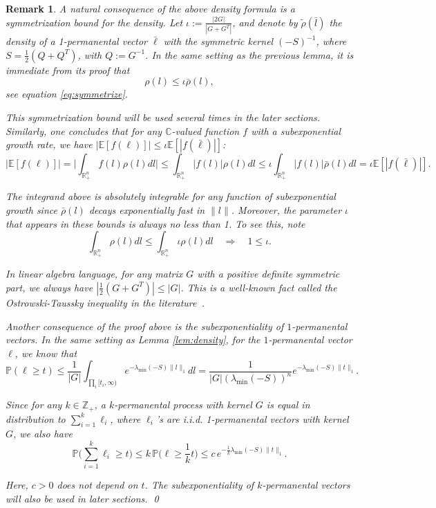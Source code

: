 \documentclass[a4paper, 11pt]{article}
\renewcommand{\P}{\mathbb{P}}
\newcommand{\E}{\mathbb{E}}
\newtheorem{rem}{Remark}[thm]
\begin{document}
\vspace{.3em} \begin{rem}
A natural consequence of the above density formula is a symmetrization bound for the density.
Let $\iota:=\frac{|2G|}{|G+G^T|}$, and denote by $\tilde{\rho}(\bar{l})$
the density of a 1-permanental vector
$\bar{\ell}$ with the symmetric kernel $(-S)^{-1}$, where $S=\frac{1}{2}(Q+Q^T)$, with $Q := G^{-1}$. In the same setting as the previous lemma, it is immediate from its proof that
\[\rho(l)\leq \iota\bar{\rho}(l),\]
see equation \eqref{eq:symmetrize}.

This symmetrization bound will be used several times in the later sections. Similarly, one concludes that for any $\mathbb{C}$-valued function $f$ with a subexponential growth rate, we have $|\E[f(\ell)]|\leq \iota \E[|f(\bar{\ell})|]$:
\[|\E[f(\ell)]|=\bigg|\int_{\mathbb{R}_+^n} f(l)\rho(l) dl\bigg| \leq \int_{\mathbb{R}_+^n} |f(l)|\rho(l) dl \leq \iota \int_{\mathbb{R}_+^n} |f(l)|\bar{\rho}(l) dl = \iota\E[|f(\bar{\ell})|].\]

The integrand above is absolutely integrable for any function of subexponential growth since $\bar{\rho}(l)$ decays exponentially fast in
$\|l\|$. Moreover, the parameter $\iota$ that
appears in these bounds is always no less than 1. To see this, note
\[\int_{\mathbb{R}_+^n} \rho(l) dl\leq \int_{\mathbb{R}_+^n} \iota \rho(l) dl\quad\Rightarrow\quad 1\leq \iota.\]

In linear algebra language, for any matrix $G$ with a positive definite symmetric part,
we always have $|\frac{1}{2}(G+G^T)|\leq |G|$. This is a well-known fact called the Ostrowski-Taussky inequality in the literature~\cite{ot51}.

Another consequence of the proof above is the subexponentiality of $1$-permanental vectors. In the same setting as Lemma \ref{lem:density}, for the $1$-permanental vector $\ell$, we know that
\[\P(\ell\geq t)\leq \frac{1}{|G|}\int_{\prod_i[t_i,\infty)} e^{-\lambda_{\min}(-S)\|l\|_1}dl=\frac{1}{|G|(\lambda_{\min}(-S))^n}e^{-\lambda_{\min}(-S)\|t\|_1}.\]

Since for any $k\in\mathbb{Z}_+$, a $k$-permanental process with kernel $G$ is equal in distribution to $\sum_{i=1}^k\ell_i$, where $\ell_i$'s are i.i.d. 1-permanental vectors with kernel $G$, we also have
\[\P\bigg(\sum_{i=1}^k\ell_i\geq t\bigg)\leq k\, \P\Big(\ell\geq \frac{1}{k}t\Big)\leq c\, e^{-\frac{1}{k}\lambda_{\min}(-S)\|t\|_1}.\]

Here, $c>0$ does not depend on $t$. The subexponentiality of $k$-permanental vectors will also be used in later sections. \qed
\end{rem}
\end{document}
